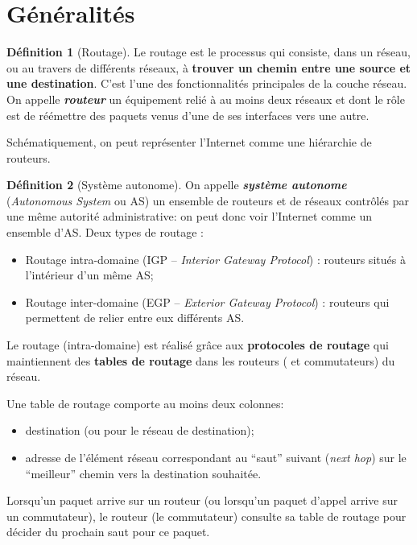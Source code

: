 \documentclass[11pt,english,french]{scrreprt}
\theoremstyle{remark}
\theoremstyle{definition}
\newtheorem*{def*}{Définition}
\begin{document}
\section{Généralités} %

\begin{def*}[Routage]
	Le routage est le processus qui consiste, dans un réseau, ou au travers de différents réseaux, à \textbf{trouver un chemin entre une source et une destination}. C'est l'une des fonctionnalités principales de la couche réseau. On appelle \textbf{\textit{routeur}} un équipement relié à au moins deux réseaux et dont le rôle est de réémettre des paquets venus d'une de ses interfaces vers une autre.
\end{def*}

	Schématiquement, on peut représenter l'Internet comme une hiérarchie de routeurs.
	
\begin{def*}[Système autonome]
	On appelle \textbf{\textit{système autonome}} (\textit{Autonomous System} ou AS) un ensemble de routeurs et de réseaux contrôlés par une même autorité administrative: on peut donc voir l'Internet comme un ensemble d'AS. 
	Deux types de routage :\begin{itemize}
		\item Routage intra-domaine (IGP -- \emph{Interior Gateway Protocol}) :  routeurs situés à l'intérieur d'un même AS;
		\item Routage inter-domaine (EGP -- \emph{Exterior Gateway Protocol}) : routeurs qui permettent de relier entre eux différents AS.
	\end{itemize}
\end{def*}
	
	Le routage (intra-domaine) est réalisé grâce aux \textbf{protocoles de routage} qui maintiennent des \textbf{tables de routage} dans les routeurs ( et commutateurs) du réseau. 
	
	Une table de routage comporte au moins deux colonnes: \begin{itemize}
		\item destination (ou pour le réseau de destination);
		\item adresse de l'élément réseau correspondant au ``saut'' suivant (\textit{next hop}) sur le ``meilleur'' chemin vers la destination souhaitée.
	\end{itemize}
	
	Lorsqu'un paquet arrive sur un routeur (ou lorsqu'un paquet d'appel arrive sur un commutateur), le routeur (le commutateur) consulte sa table de routage pour décider du prochain saut pour ce paquet.
\end{document}
